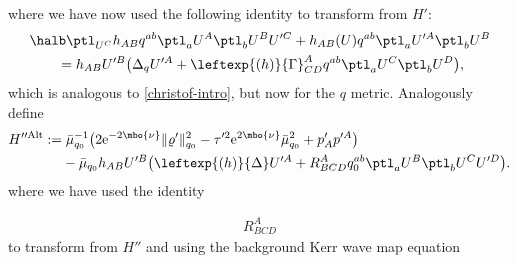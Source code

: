 where we have now used the following identity to transform from $H'$:
\begin{align*}
&\halb \ptl_{U^C} h_{AB} q^{ab} \ptl_a U^A \ptl_b U^B U'^C + h_{AB}(U) q^{ab} \ptl_a U'^A \ptl_b U^B \notag\\
&\qquad{}= h_{AB} U'^B \bigl(\Delta_q U'^A + \leftexp{(h)}{\Gamma}^A _{CD} q^{ab} \ptl_a U^C \ptl_b U^D\bigr),
\end{align*}
which is analogous to \eqref{christof-intro}, but now for the $q$ metric. %
Analogously define
\begin{align*}
H''^{{\rm Alt}} &:= \bar{\mu}^{-1}_{q_0} \bigl(2 {\rm e}^{-2 \mbo{\nu}} \Vert \varrho' \Vert^2_{q_0} - \tau'^2 {\rm e}^{2 \mbo{\nu}} \bar{\mu}^2_{q_0} + p'_A p'^A\bigr) \notag\\
&\ \quad{}- \bar{\mu}_{q_0} h_{AB} U'^B\bigl(\leftexp{(h)}{\Delta} U'^A +R^A_{BCD} q_0^{ab} \ptl_a U^B \ptl_b U^C U'^D\bigr).
\end{align*}
\iffalse
where we have used the identity

\begin{align}
R^{A}_{BCD}
\end{align}
to transform from $H''$ and using the background Kerr wave map equation

